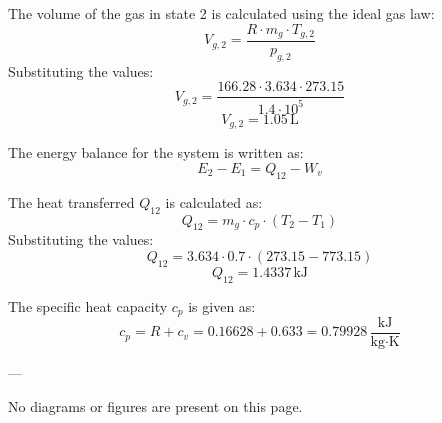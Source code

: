The volume of the gas in state 2 is calculated using the ideal gas law:  
\[
V_{g,2} = \frac{R \cdot m_g \cdot T_{g,2}}{p_{g,2}}
\]  
Substituting the values:  
\[
V_{g,2} = \frac{166.28 \cdot 3.634 \cdot 273.15}{1.4 \cdot 10^5}
\]  
\[
V_{g,2} = 1.05 \, \text{L}
\]  

The energy balance for the system is written as:  
\[
E_2 - E_1 = Q_{12} - W_v
\]  

The heat transferred \( Q_{12} \) is calculated as:  
\[
Q_{12} = m_g \cdot c_p \cdot (T_2 - T_1)
\]  
Substituting the values:  
\[
Q_{12} = 3.634 \cdot 0.7 \cdot (273.15 - 773.15)
\]  
\[
Q_{12} = 1.4337 \, \text{kJ}
\]  

The specific heat capacity \( c_p \) is given as:  
\[
c_p = R + c_v = 0.16628 + 0.633 = 0.79928 \, \frac{\text{kJ}}{\text{kg·K}}
\]  

---

No diagrams or figures are present on this page.